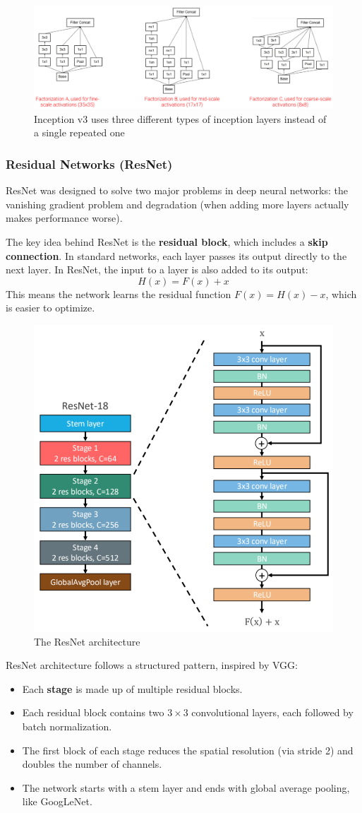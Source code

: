 \begin{figure}[htbp]
  \centering
  \includegraphics[width=0.8\linewidth]{./img/inception3.png}
  \caption{Inception v3 uses three different types of inception layers instead of a single repeated one}
\end{figure}

\subsubsection{Residual Networks (ResNet)}
ResNet was designed to solve two major problems in deep neural networks: the vanishing gradient problem and degradation (when adding more layers actually makes performance worse). 

The key idea behind ResNet is the \textbf{residual block}, which includes a \textbf{skip connection}. In standard networks, each layer passes its output directly to the next layer. In ResNet, the input to a layer is also added to its output:
\[
H(x) = F(x) + x
\]
This means the network learns the residual function $F(x) = H(x) - x$, which is easier to optimize.

\begin{figure}[htbp]
  \centering
  \includegraphics[width=0.4\linewidth]{./img/resnet.png}
  \caption{The ResNet architecture}
\end{figure}

ResNet architecture follows a structured pattern, inspired by VGG:
\begin{itemize}
  \item Each \textbf{stage} is made up of multiple residual blocks.
  \item Each residual block contains two $3 \times 3$ convolutional layers, each followed by batch normalization.
  \item The first block of each stage reduces the spatial resolution (via stride 2) and doubles the number of channels.
  \item The network starts with a stem layer and ends with global average pooling, like GoogLeNet.
\end{itemize}


